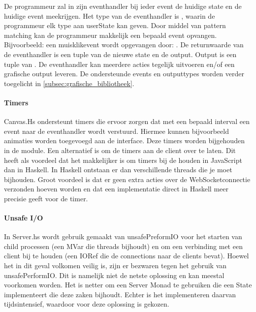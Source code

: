 De programmeur zal in zijn eventhandler bij ieder event de huidige state en de huidige event meekrijgen. Het type van de eventhandler is , waarin de programmeur elk type aan userState kan geven. Door middel van pattern matching kan de programmeur makkelijk een bepaald event opvangen. Bijvoorbeeld: een muisklikevent wordt opgevangen door: . De returnwaarde van de eventhandler is een tuple van de nieuwe state en de output. Output is een tuple van . De eventhandler kan meerdere acties tegelijk uitvoeren en/of een grafische output leveren. De ondersteunde events en outputtypes worden verder toegelicht in \autoref{subsec:grafische_bibliotheek}.

\paragraph{Timers}
Canvas.Hs ondersteunt timers die ervoor zorgen dat met een bepaald interval een event naar de eventhandler wordt verstuurd. Hiermee kunnen bijvoorbeeld animaties worden toegevoegd aan de interface. Deze timers worden bijgehouden in de module. Een alternatief is om de timers aan de client over te laten. Dit heeft als voordeel dat het makkelijker is om timers bij de houden in JavaScript dan in Haskell. In Haskell ontstaan er dan verschillende threads die je moet bijhouden. Groot voordeel is dat er geen extra acties over de WebSocketconnectie verzonden hoeven worden en dat een implementatie direct in Haskell meer precisie geeft voor de timer.

\paragraph{Unsafe I/O}
In Server.hs wordt gebruik gemaakt van unsafePreformIO voor het starten van child processen (een MVar die threads bijhoudt) en om een verbinding met een client bij te houden (een IORef die de connections naar de clients bevat). Hoewel het in dit geval volkomen veilig is, zijn er bezwaren tegen het gebruik van unsafePerformIO\cite{Haskell.org2008}. Dit is namelijk niet de netste oplossing en kan meestal voorkomen worden. Het is netter om een Server Monad te gebruiken die een State implementeert die deze zaken bijhoudt. Echter is het implementeren daarvan tijdsintensief, waardoor voor deze oplossing is gekozen.